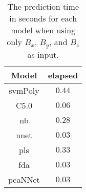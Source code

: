 \begin{table}[!ht]
	\centering
	\begin{tabular}{|c|c|}
		\hline
		Model & elapsed \\ \hline
		svmPoly & $0.44$ \\ \hline
		C5.0 & $0.06$ \\ \hline
		nb & $0.28$ \\ \hline
		nnet & $0.03$ \\ \hline
		pls & $0.33$ \\ \hline
		fda & $0.03$ \\ \hline
		pcaNNet & $0.03$ \\ \hline
	\end{tabular}
	\caption{The prediction time in seconds for each model when using only $B_{x}$, $B_{y}$, and $B_{z}$ as input.}
	\label{tab:time:coord:predict}
\end{table}

